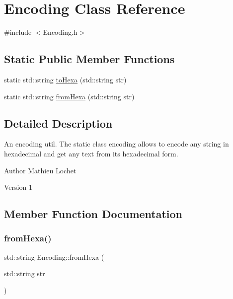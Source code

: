 \hypertarget{classEncoding}{}\section{Encoding Class Reference}
\label{classEncoding}


{\ttfamily \#include $<$Encoding.\+h$>$}

\subsection*{Static Public Member Functions}
\begin{DoxyCompactItemize}
\item 
static std\+::string \mbox{\hyperlink{classEncoding_afa3343b66a1a0598b2dc01d74cb81861}{to\+Hexa}} (std\+::string str)
\item 
static std\+::string \mbox{\hyperlink{classEncoding_ada74f7af3be5feeebafe09ede785805a}{from\+Hexa}} (std\+::string str)
\end{DoxyCompactItemize}


\subsection{Detailed Description}
An encoding util. The static class encoding allows to encode any string in hexadecimal and get any text from its hexadecimal form.

\begin{DoxyAuthor}{Author}
Mathieu Lochet 
\end{DoxyAuthor}
\begin{DoxyVersion}{Version}
1 
\end{DoxyVersion}


\subsection{Member Function Documentation}
\mbox{\label{classEncoding_ada74f7af3be5feeebafe09ede785805a}} 
\subsubsection{\texorpdfstring{from\+Hexa()}{fromHexa()}}
{\footnotesize\ttfamily std\+::string Encoding\+::from\+Hexa (\begin{DoxyParamCaption}\item[{std\+::string}]{str }\end{DoxyParamCaption})\hspace{0.3cm}{\ttfamily [static]}}


